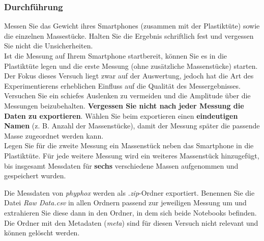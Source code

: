 \documentclass[12pt]{scrbook}
\begin{document}
\subsubsection{Durchführung}

Messen Sie das Gewicht ihres Smartphones (zusammen mit der Plastiktüte) sowie die einzelnen Massestücke. Halten Sie die Ergebnis schriftlich fest und vergessen Sie nicht die Unsicherheiten.\\
Ist die Messung auf Ihrem Smartphone startbereit, können Sie es in die Plastiktüte legen und die erste Messung (ohne zusätzliche Massenstücke) starten. Der Fokus dieses Versuch liegt zwar auf der Auswertung, jedoch hat die Art des Experimentierens erheblichen Einfluss auf die Qualität des Messergebnisses. Versuchen Sie ein schiefes Auslenken zu vermeiden und die Amplitude über die Messungen beizubehalten. \textbf{Vergessen Sie nicht nach jeder Messung die Daten zu exportieren}. Wählen Sie beim exportieren einen \textbf{eindeutigen Namen} (z. B. Anzahl der Massenstücke), damit der Messung später die passende Masse zugeordnet werden kann.\\ Legen Sie für die zweite Messung ein Massenstück neben das Smartphone in die Plastiktüte. Für jede weitere Messung wird ein weiteres Massenstück hinzugefügt, bis insgesamt Messdaten für \textbf{sechs} verschiedene Massen aufgenommen und gespeichert wurden.

Die Messdaten von \textit{phyphox} werden als \textit{.zip}-Ordner exportiert. Benennen Sie die Datei \textit{Raw Data.csv} in allen Ordnern passend zur jeweiligen Messung um und extrahieren Sie diese dann in den Ordner, in dem sich beide Notebooks befinden. Die Ordner mit den Metadaten (\textit{meta}) sind für diesen Versuch nicht relevant und können gelöscht werden.
\end{document}
